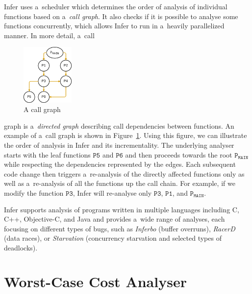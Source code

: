 \documentclass{ExcelAtFIT}
\begin{document}
Infer uses a~scheduler which determines the order of
analysis of individual functions based on a~\textit{call graph}.
It also checks if it is possible to analyse some functions
concurrently, which allows Infer to run in a~heavily
parallelized manner. In more detail, a~call
\begin{figure}
    \centering
    \includegraphics[width=0.23\textwidth]{images/infer/callgraph.png}
    \caption{A call graph}
    \label{fig:infer-callgraph}
\end{figure}
graph is a~\emph{directed graph}
describing call dependencies
between functions. An example of a~call graph is shown in
Figure~\ref{fig:infer-callgraph}. Using this figure, we can illustrate
the order of analysis in Infer and its incrementality.
The underlying analyser starts with the leaf functions $\mathtt{P5}$
and $\mathtt{P6}$
and then proceeds
towards the root $\mathtt{P_{MAIN}}$ while respecting
the dependencies represented by the edges.
Each subsequent code change then triggers
a~re-analysis of the directly affected functions only
as well as a~re-analysis of all the functions up the call chain.
For example, if we modify the function $\mathtt{P3}$, Infer
will re-analyse only $\mathtt{P3}$,
$\mathtt{P1}$, and $\mathtt{P_{MAIN}}$.

Infer supports analysis of programs written in multiple
languages including C, C++, Objective-C, and Java and provides
a~wide range of analyses, each focusing on different types of bugs,
such as \textit{Inferbo} (buffer overruns),
\textit{RacerD}~\cite{racerd} (data races),
or \textit{Starvation} (concurrency starvation and
selected types of deadlocks).

\section{Worst-Case Cost Analyser}
\label{sec:worst-case-analyser}
\end{document}
